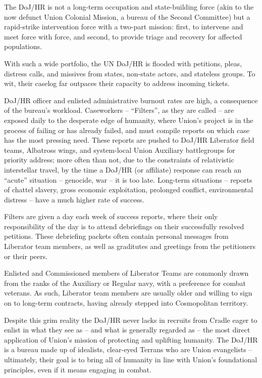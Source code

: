 The DoJ/HR is not a long-term occupation and state-building force (akin to the now defunct Union  
Colonial Mission, a bureau of the Second Committee) but a rapid-strike intervention force with a  
two-part mission: first, to intervene and meet force with force, and second, to provide triage and  
recovery for affected populations.   

                                                                                                          


With such a wide portfolio, the UN DoJ/HR is flooded with petitions, pleas, distress calls, and  
missives from states, non-state actors, and stateless groups. To wit, their caselog far outpaces  
their capacity to address incoming tickets.  

DoJ/HR officer and enlisted administrative burnout rates are high, a consequence of the bureau’s  
workload. Caseworkers -- “Filters”, as they are called -- are exposed daily to the desperate edge  
of humanity, where Union’s project is in the process of failing or has already failed, and must  
compile reports on which case has the most pressing need. These reports are pushed to DoJ/HR  
Liberator field teams, Albatross wings, and system-local Union Auxiliary battlegroups for priority  
address; more often than not, due to the constraints of relativistic interstellar travel, by the time a  
DoJ/HR (or affiliate) response can reach an “acute” situation -- genocide, war -- it is too late.  
Long-term situations -- reports of chattel slavery, gross economic exploitation, prolonged conflict,  
environmental distress -- have a much higher rate of success.   

Filters are given a day each week of success reports, where their only responsibility of the day is  
to attend debriefings on their successfully resolved petitions. These debriefing packets often  
contain personal messages from Liberator team members, as well as graditutes and greetings  
from the petitioners or their peers.   

Enlisted and Commissioned members of Liberator Teams are commonly drawn from the ranks of  
the Auxiliary or Regular navy, with a preference for combat veterans. As such, Liberator team  
members are usually older and willing to sign on to long-term contracts, having already stepped  
into Cosmopolitan territory.   

Despite this grim reality the DoJ/HR never lacks in recruits from Cradle eager to enlist in what  
they see as -- and what is generally regarded as -- the most direct application of Union’s mission  
of protecting and uplifting humanity. The DoJ/HR is a bureau made up of idealists, clear-eyed  
Terrans who are Union evangelists -- ultimately, their goal is to bring all of humanity in line with  
Union’s foundational principles, even if it means engaging in combat.     


